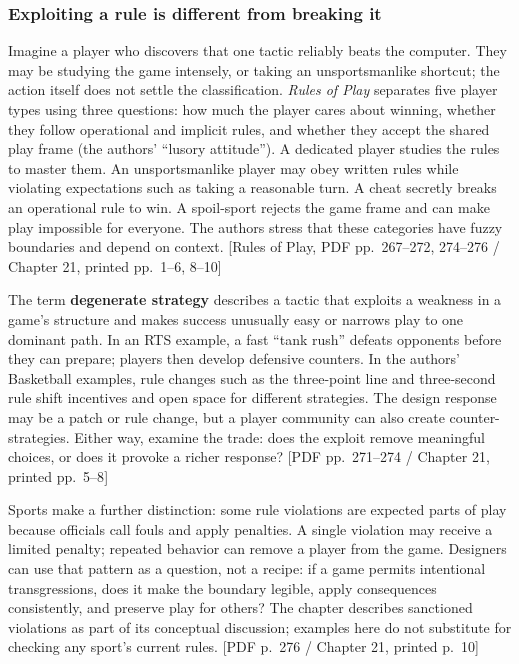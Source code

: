 \subsubsection{Exploiting a rule is different from breaking it}\label{05-engine-i-ch009-exploiting-a-rule-is-different-from-breaking-it}

\hypertarget{05-engine-i-ch009-exploiting-a-rule-is-different-from-breaking-it}{}

Imagine a player who discovers that one tactic reliably beats the computer. They may be studying the game intensely, or taking an unsportsmanlike shortcut; the action itself does not settle the classification. \emph{Rules of Play} separates five player types using three questions: how much the player cares about winning, whether they follow operational and implicit rules, and whether they accept the shared play frame (the authors' ``lusory attitude''). A dedicated player studies the rules to master them. An unsportsmanlike player may obey written rules while violating expectations such as taking a reasonable turn. A cheat secretly breaks an operational rule to win. A spoil-sport rejects the game frame and can make play impossible for everyone. The authors stress that these categories have fuzzy boundaries and depend on context. {[}Rules of Play, PDF pp.~267--272, 274--276 / Chapter 21, printed pp.~1--6, 8--10{]}

The term \textbf{degenerate strategy} describes a tactic that exploits a weakness in a game's structure and makes success unusually easy or narrows play to one dominant path. In an RTS example, a fast ``tank rush'' defeats opponents before they can prepare; players then develop defensive counters. In the authors' Basketball examples, rule changes such as the three-point line and three-second rule shift incentives and open space for different strategies. The design response may be a patch or rule change, but a player community can also create counter-strategies. Either way, examine the trade: does the exploit remove meaningful choices, or does it provoke a richer response? {[}PDF pp.~271--274 / Chapter 21, printed pp.~5--8{]}

Sports make a further distinction: some rule violations are expected parts of play because officials call fouls and apply penalties. A single violation may receive a limited penalty; repeated behavior can remove a player from the game. Designers can use that pattern as a question, not a recipe: if a game permits intentional transgressions, does it make the boundary legible, apply consequences consistently, and preserve play for others? The chapter describes sanctioned violations as part of its conceptual discussion; examples here do not substitute for checking any sport's current rules. {[}PDF p.~276 / Chapter 21, printed p.~10{]}

